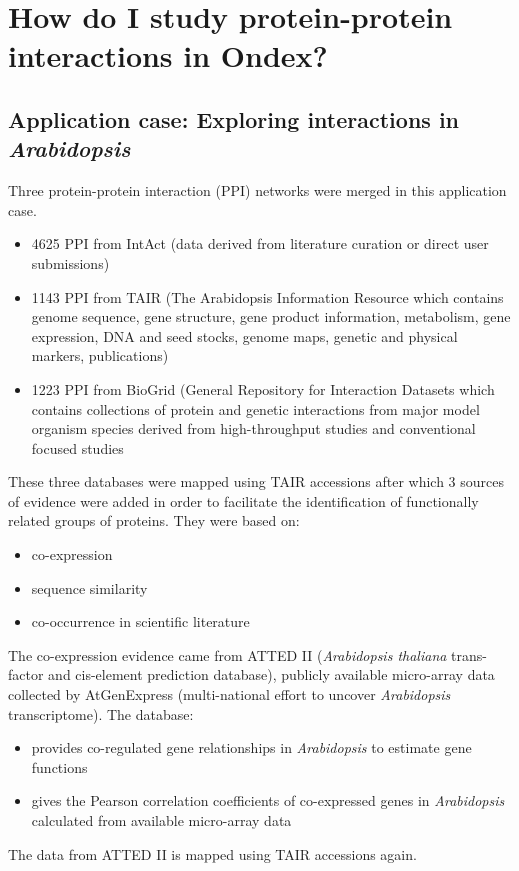 \chapter{How do I study protein-protein interactions in Ondex?}
\label{cha:ppi}


\section*{Application case: Exploring interactions in \textit{Arabidopsis}}
\label{sec:artem}
Three protein-protein interaction (PPI) networks were merged in this application case.
\begin{itemize}
\item 4625 PPI from IntAct (data derived from literature curation or direct user submissions)
\item 1143 PPI from TAIR (The Arabidopsis Information Resource which contains
genome sequence, gene structure, gene product information, metabolism, gene expression, DNA and seed stocks, 
genome maps, genetic and physical markers, publications)
\item 1223 PPI from BioGrid (General Repository for Interaction Datasets which contains
collections of protein and genetic interactions from major model organism species derived from high-throughput studies and conventional focused studies
\end{itemize}

These three databases were mapped using TAIR accessions after which 3 sources of evidence were added 
in order to facilitate the identification of functionally related groups of proteins. 
They were based on:
\begin{itemize}
\item co-expression
\item sequence similarity
\item co-occurrence in scientific literature
\end{itemize}

The co-expression evidence came from ATTED II (\textit{Arabidopsis thaliana} trans-factor and cis-element prediction database),
publicly available micro-array data collected by AtGenExpress (multi-national effort to uncover \textit{Arabidopsis} transcriptome).
The database:
\begin{itemize}
\item provides co-regulated gene relationships in \textit{Arabidopsis} to estimate gene functions
\item gives the Pearson correlation coefficients of co-expressed genes in \textit{Arabidopsis} calculated from available micro-array data
\end{itemize}
The data from ATTED II is mapped using TAIR accessions again.

